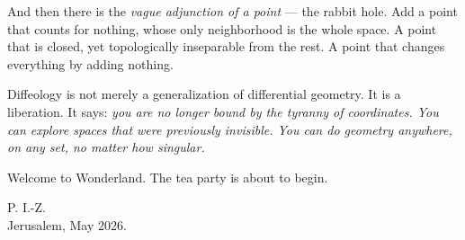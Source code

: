 And then there is the \emph{vague adjunction of a point}
— the rabbit hole.
Add a point that counts for nothing,
whose only neighborhood is the whole space.
A point that is closed, yet topologically inseparable from the rest.
A point that changes everything by adding nothing.

Diffeology is not merely a generalization of differential geometry.
It is a liberation.
It says: \emph{you are no longer bound by the tyranny of coordinates. You can explore spaces that were previously invisible. You can do geometry anywhere, on any set, no matter how singular.}

Welcome to Wonderland.
The tea party is about to begin.

\smallskip
\begin{flushright}
  P. I.-Z. \\
  Jerusalem, May 2026.
\end{flushright}
